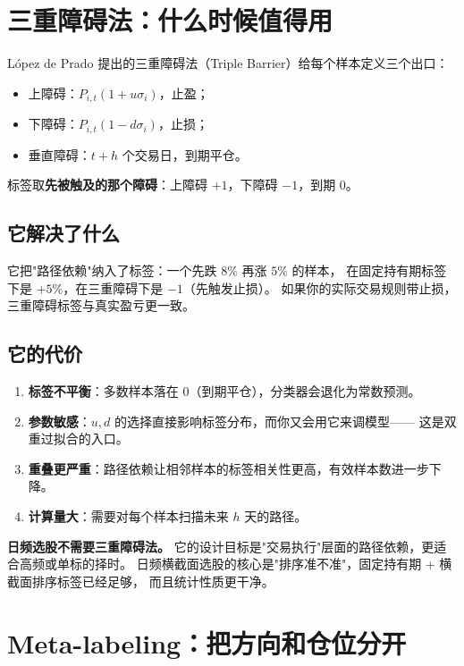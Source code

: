 \section{三重障碍法：什么时候值得用}

López de Prado 提出的三重障碍法（Triple Barrier）给每个样本定义三个出口：

\begin{itemize}
  \item 上障碍：$P_{i,t}(1 + u\sigma_i)$，止盈；
  \item 下障碍：$P_{i,t}(1 - d\sigma_i)$，止损；
  \item 垂直障碍：$t + h$ 个交易日，到期平仓。
\end{itemize}

标签取\textbf{先被触及的那个障碍}：上障碍 $+1$，下障碍 $-1$，到期 $0$。

\subsection{它解决了什么}

它把"路径依赖"纳入了标签：一个先跌 $8\%$ 再涨 $5\%$ 的样本，
在固定持有期标签下是 $+5\%$，在三重障碍下是 $-1$（先触发止损）。
如果你的实际交易规则带止损，三重障碍标签与真实盈亏更一致。

\subsection{它的代价}

\begin{enumerate}
  \item \textbf{标签不平衡}：多数样本落在 $0$（到期平仓），分类器会退化为常数预测。
  \item \textbf{参数敏感}：$u,d$ 的选择直接影响标签分布，而你又会用它来调模型——
        这是双重过拟合的入口。
  \item \textbf{重叠更严重}：路径依赖让相邻样本的标签相关性更高，有效样本数进一步下降。
  \item \textbf{计算量大}：需要对每个样本扫描未来 $h$ 天的路径。
\end{enumerate}

\begin{keybox}[本书的判断]
\textbf{日频选股不需要三重障碍法。}
它的设计目标是"交易执行"层面的路径依赖，更适合高频或单标的择时。
日频横截面选股的核心是"排序准不准"，固定持有期 + 横截面排序标签已经足够，
而且统计性质更干净。
\end{keybox}

\section{Meta-labeling：把方向和仓位分开}

